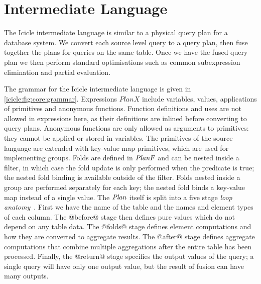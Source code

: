 \section{Intermediate Language}
\label{icicle:s:IcicleCore}

The Icicle intermediate language is similar to a physical query plan for a database system.
We convert each source level query to a query plan, then fuse together the plans for queries on the same table.
Once we have the fused query plan we then perform standard optimisations such as common subexpression elimination and partial evaluation.

The grammar for the Icicle intermediate language is given in \cref{icicle:fig:core:grammar}.
Expressions $PlanX$ include variables, values, applications of primitives and anonymous functions.
Function definitions and uses are not allowed in expressions here, as their definitions are inlined before converting to query plans.
Anonymous functions are only allowed as arguments to primitives: they cannot be applied or stored in variables.
The primitives of the source language are extended with key-value map primitives, which are used for implementing groups.
Folds are defined in $\mathit{PlanF}$ and can be nested inside a filter, in which case the fold update is only performed when the predicate is true; the nested fold binding is available outside of the filter.
Folds nested inside a group are performed separately for each key; the nested fold binds a key-value map instead of a single value.
The $\mathit{Plan}$ itself is split into a five stage \emph{loop anatomy}~\cite{shivers2005anatomy}.
First we have the name of the table and the names and element types of each column.
The @before@ stage then defines pure values which do not depend on any table data.
The @folds@ stage defines element computations and how they are converted to aggregate results.
The @after@ stage defines aggregate computations that combine multiple aggregations after the entire table has been processed.
Finally, the @return@ stage specifies the output values of the query; a single query will have only one output value, but the result of fusion can have many outputs.

